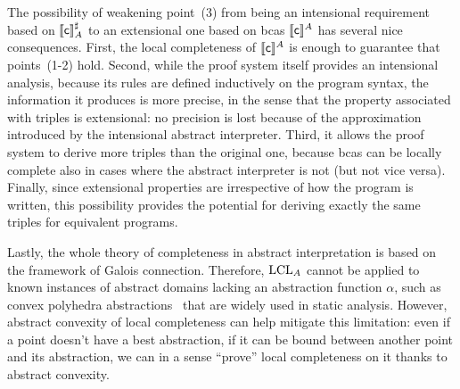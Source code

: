 The possibility of weakening point~(3) from being an intensional requirement based on $\llbracket\mathsf{c}\rrbracket^{\sharp}_A$ to an extensional one based on bcas $\llbracket\mathsf{c}\rrbracket^A$ has several nice consequences.
First, the local completeness of $\llbracket\mathsf{c}\rrbracket^A$ is enough to guarantee that points~(1-2) hold.
Second, while the proof system itself provides an intensional analysis, because its rules are defined inductively on the program syntax, the information it produces is more precise, in the sense that the property associated with triples is extensional: no precision is lost because of the approximation introduced by the intensional abstract interpreter.
Third, it allows the proof system to derive more triples than the original one, because bcas can be locally complete also in cases where the abstract interpreter is not (but not vice versa).
Finally, since extensional properties are irrespective of how the program is written, this possibility provides the potential for deriving exactly the same triples for equivalent programs.

Lastly, the whole theory of completeness in abstract interpretation is based on the framework of Galois connection. Therefore, $\text{LCL}_A$ cannot be applied to known instances of abstract domains lacking an abstraction function $\alpha$, such as convex polyhedra abstractions~\cite{CH78} that are widely used in static analysis. However, abstract convexity of local completeness can help mitigate this limitation: even if a point doesn't have a best abstraction, if it can be bound between another point and its abstraction, we can in a sense ``prove'' local completeness on it thanks to abstract convexity.

